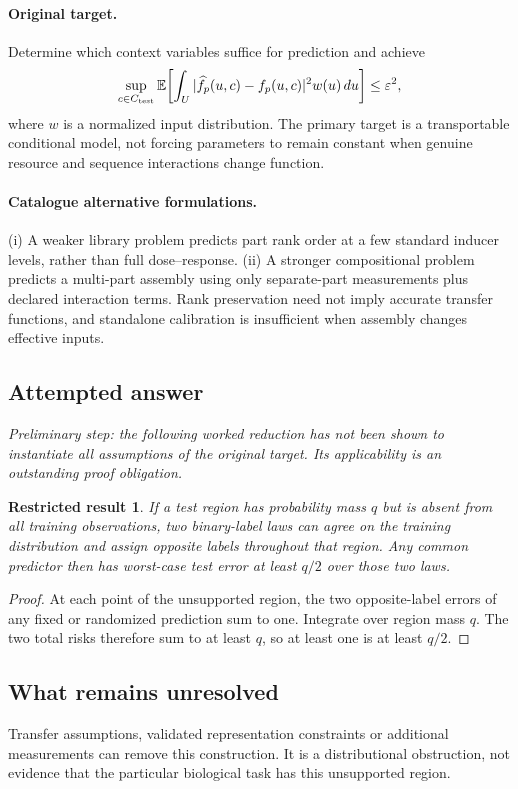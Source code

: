 \documentclass[11pt]{article}
\newcommand{\E}{\mathbb E}
\providecommand{\E}{\mathbb E}
\newtheorem{attemptresult}{Restricted result}[section]
\begin{document}
\paragraph{Original target.}
Determine which context variables suffice for prediction and achieve
\[
\sup_{c\in C_{\rm test}}\E\!\left[\int_U
|\widehat f_p(u,c)-f_p(u,c)|^2w(u)\,du\right]\leq\varepsilon^2,
\]
where $w$ is a normalized input distribution. The primary target is a transportable conditional model, not forcing parameters to remain constant when genuine resource and sequence interactions change function.
\paragraph{Catalogue alternative formulations.}
(i) A weaker library problem predicts part rank order at a few standard inducer levels, rather than full dose--response. (ii) A stronger compositional problem predicts a multi-part assembly using only separate-part measurements plus declared interaction terms. Rank preservation need not imply accurate transfer functions, and standalone calibration is insufficient when assembly changes effective inputs.
\subsection{Attempted answer}
\noindent\emph{Preliminary step: the following worked reduction has not been shown to instantiate all assumptions of the original target. Its applicability is an outstanding proof obligation.}

\begin{attemptresult}
If a test region has probability mass $q$ but is absent from all training observations, two binary-label laws can agree on the training distribution and assign opposite labels throughout that region. Any common predictor then has worst-case test error at least $q/2$ over those two laws.
\end{attemptresult}
\begin{proof}
At each point of the unsupported region, the two opposite-label errors of any fixed or randomized prediction sum to one. Integrate over region mass $q$. The two total risks therefore sum to at least $q$, so at least one is at least $q/2$.
\end{proof}
\subsection{What remains unresolved}
Transfer assumptions, validated representation constraints or additional measurements can remove this construction. It is a distributional obstruction, not evidence that the particular biological task has this unsupported region.
\end{document}
